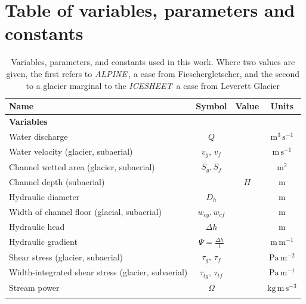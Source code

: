 \documentclass[draft]{agujournal2019}
\newcommand{\alpine}{\textit{ALPINE}\,}
\newcommand{\icesheet}{\textit{ICESHEET}\,}
\begin{document}
\section{Table of variables, parameters and constants}
\begin{table}[h]
  \centering
  \caption{Variables, parameters, and constants used in this work.
    Where two values are given, the first refers to  \alpine{}, a case from Fieschergletscher, and the second to a glacier marginal to the \icesheet{} a case from Leverett Glacier}
  \begin{tabular}{ l  c  c c }
    Name &Symbol&  Value&Units \\ \hline
    \textbf{Variables}  & & & \\
    Water discharge  & $Q$& & $\mathrm{m^{3}\,s^{-1}}$ \\
    Water velocity (glacier, subaerial)  & $v_g,\,v_{f}$& & $\mathrm{m\,s^{-1}}$ \\
    Channel wetted area (glacier, subaerial) &  $S_g, S_f$& & $\mathrm{m^2}$     \\
    Channel depth (subaerial) & &$H$& $\mathrm{m}$\\
    Hydraulic diameter &$D_h$&&$\mathrm{m}$\\
    Width of channel floor (glacial, subaerial) & $w_{cg},w_{cf}$&  & $\mathrm{m}$     \\
    Hydraulic head &$\Delta h$&& $\mathrm{m}$\\
    Hydraulic gradient &$\Psi=\frac{\Delta h}{l}$&& $\mathrm{m\, m^{-1}}$\\

    Shear stress (glacier, subaerial) & $\tau_g,\,\tau_f$&& $\mathrm{Pa \, m^{-2}}$ \\
    Width-integrated shear stress (glacier, subaerial) & $\tau_{tg},\, \tau_{tf}$&& $\mathrm{Pa \, m^{-1}}$ \\
    Stream power & $\Omega$ && $\mathrm{ kg \, m\, s^{-3}}$ \\

         &&&\\


\end{tabular}
\end{table}
\end{document}
